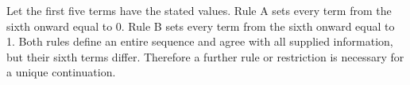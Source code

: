 Let the first five terms have the stated values. Rule A sets every term from the sixth onward equal to 0. Rule B sets every term from the sixth onward equal to 1. Both rules define an entire sequence and agree with all supplied information, but their sixth terms differ. Therefore a further rule or restriction is necessary for a unique continuation.
